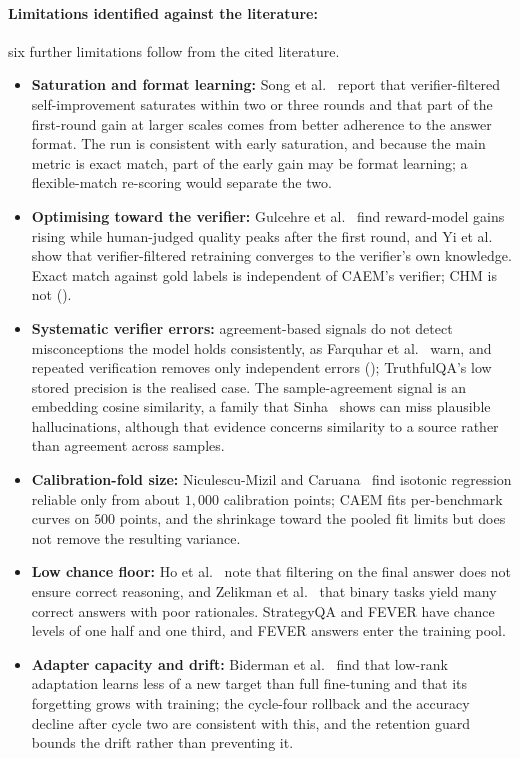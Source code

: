 \paragraph{Limitations identified against the literature:} six further limitations follow from the cited literature.
\begin{itemize}
\item \textbf{Saturation and format learning:} Song et al.~\cite{song2024gap} report that verifier-filtered self-improvement saturates within two or three rounds and that part of the first-round gain at larger scales comes from better adherence to the answer format. The run is consistent with early saturation, and because the main metric is exact match, part of the early gain may be format learning; a flexible-match re-scoring would separate the two.
\item \textbf{Optimising toward the verifier:} Gulcehre et al.~\cite{gulcehre2023rest} find reward-model gains rising while human-judged quality peaks after the first round, and Yi et al.~\cite{fu2025collapse} show that verifier-filtered retraining converges to the verifier's own knowledge. Exact match against gold labels is independent of CAEM's verifier; CHM is not ().
\item \textbf{Systematic verifier errors:} agreement-based signals do not detect misconceptions the model holds consistently, as Farquhar et al.~\cite{farquhar2024semantic} warn, and repeated verification removes only independent errors (); TruthfulQA's low stored precision is the realised case. The sample-agreement signal is an embedding cosine similarity, a family that Sinha~\cite{sinha2025semantic} shows can miss plausible hallucinations, although that evidence concerns similarity to a source rather than agreement across samples.
\item \textbf{Calibration-fold size:} Niculescu-Mizil and Caruana~\cite{niculescu2005predicting} find isotonic regression reliable only from about $1{,}000$ calibration points; CAEM fits per-benchmark curves on $500$ points, and the shrinkage toward the pooled fit limits but does not remove the resulting variance.
\item \textbf{Low chance floor:} Ho et al.~\cite{ho2023large} note that filtering on the final answer does not ensure correct reasoning, and Zelikman et al.~\cite{NEURIPS2022_639a9a17} that binary tasks yield many correct answers with poor rationales. StrategyQA and FEVER have chance levels of one half and one third, and FEVER answers enter the training pool.
\item \textbf{Adapter capacity and drift:} Biderman et al.~\cite{biderman2024lora} find that low-rank adaptation learns less of a new target than full fine-tuning and that its forgetting grows with training; the cycle-four rollback and the accuracy decline after cycle two are consistent with this, and the retention guard bounds the drift rather than preventing it.
\end{itemize}

